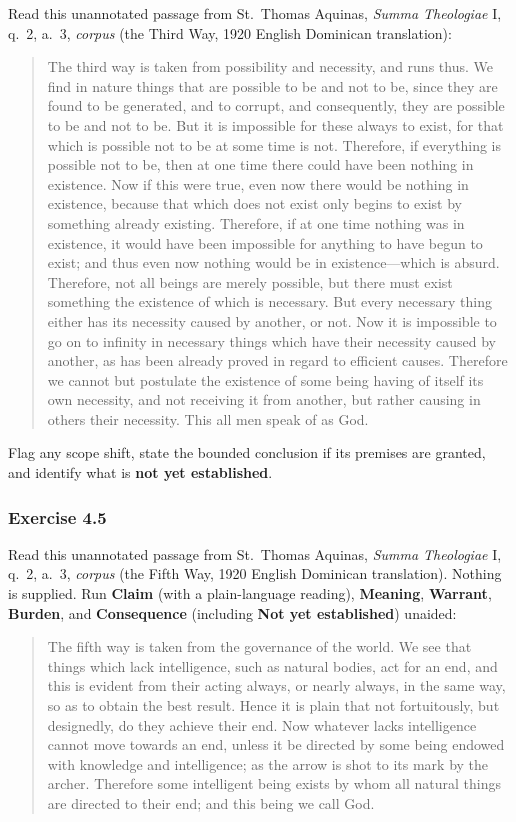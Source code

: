 Read this unannotated passage from St.\ Thomas Aquinas, \emph{Summa Theologiae} I, q.\ 2, a.\ 3, \emph{corpus} (the Third Way, 1920 English Dominican translation):

\begin{quote}
The third way is taken from possibility and necessity, and runs thus. We find in nature things that are possible to be and not to be, since they are found to be generated, and to corrupt, and consequently, they are possible to be and not to be. But it is impossible for these always to exist, for that which is possible not to be at some time is not. Therefore, if everything is possible not to be, then at one time there could have been nothing in existence. Now if this were true, even now there would be nothing in existence, because that which does not exist only begins to exist by something already existing. Therefore, if at one time nothing was in existence, it would have been impossible for anything to have begun to exist; and thus even now nothing would be in existence---which is absurd. Therefore, not all beings are merely possible, but there must exist something the existence of which is necessary. But every necessary thing either has its necessity caused by another, or not. Now it is impossible to go on to infinity in necessary things which have their necessity caused by another, as has been already proved in regard to efficient causes. Therefore we cannot but postulate the existence of some being having of itself its own necessity, and not receiving it from another, but rather causing in others their necessity. This all men speak of as God.
\end{quote}

Flag any scope shift, state the bounded conclusion if its premises are granted, and identify what is \textbf{not yet established}.

\subsubsection*{Exercise 4.5}

Read this unannotated passage from St.\ Thomas Aquinas, \emph{Summa Theologiae} I, q.\ 2, a.\ 3, \emph{corpus} (the Fifth Way, 1920 English Dominican translation). Nothing is supplied. Run \textbf{Claim} (with a plain-language reading), \textbf{Meaning}, \textbf{Warrant}, \textbf{Burden}, and \textbf{Consequence} (including \textbf{Not yet established}) unaided:

\begin{quote}
The fifth way is taken from the governance of the world. We see that things which lack intelligence, such as natural bodies, act for an end, and this is evident from their acting always, or nearly always, in the same way, so as to obtain the best result. Hence it is plain that not fortuitously, but designedly, do they achieve their end. Now whatever lacks intelligence cannot move towards an end, unless it be directed by some being endowed with knowledge and intelligence; as the arrow is shot to its mark by the archer. Therefore some intelligent being exists by whom all natural things are directed to their end; and this being we call God.
\end{quote}

